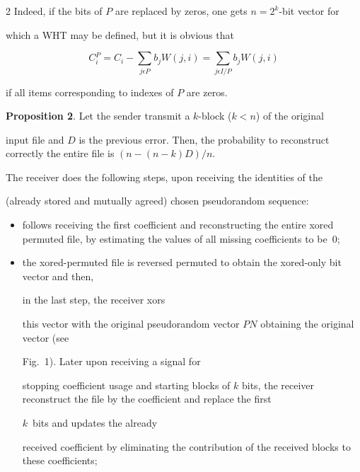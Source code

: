 \begin{multicols}{2}
Indeed, if the bits of $P$ are replaced by zeros, one gets $n=2^k $-bit vector for 

which a WHT may be defined, but it is obvious that

$$

C{^P_i}=C_i-\sum\limits_{j\epsilon P} b_j W(j,i)=\sum\limits_{j\epsilon I/P} b_j W(j,i)

$$

if all items corresponding to indexes of $P$ are zeros.



\smallskip



\noindent

\textbf{Proposition 2}. Let the sender transmit a $k$-block ($k<n$) of the original 

input file and $D$ is the previous error. Then, the probability to reconstruct correctly the entire file is $(n-(n-k)D)/n$.



\smallskip









The receiver does the following steps, upon receiving the identities of the 

(already stored and mutually agreed) chosen pseudorandom sequence: 

\begin{itemize}

\item[(a)] follows receiving the first coefficient and reconstructing the entire xored permuted file, by estimating the values of all missing coefficients to be~0;

\item[(b)] the xored-permuted file  is reversed permuted to obtain  the xored-only bit vector  and then,

in the last step, the receiver xors  

this vector  with the original pseudorandom vector $PN$ obtaining the original vector (see 

Fig.~1). Later upon receiving a signal for 

stopping coefficient usage and starting blocks of $k$ bits, the receiver reconstruct the file by the coefficient and replace the first 

$k$~bits and updates the already 

received coefficient by eliminating the contribution of the received blocks to these coefficients;


\end{itemize}
\end{multicols}
